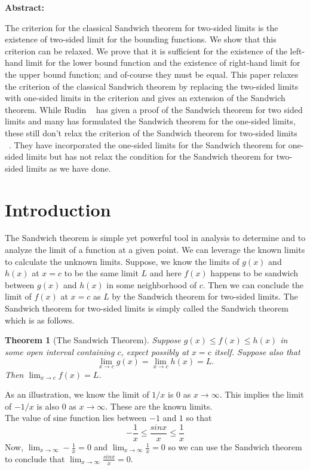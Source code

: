 \documentclass[a4paper,twoside,12pt]{article}
\theoremstyle{plain}
\newtheorem{theorem}{Theorem}[section]
\theoremstyle{definition}
\theoremstyle{theorem}
\begin{document}
\vspace{5mm}
\noindent
\textbf{Abstract:} {The criterion for the classical Sandwich theorem for two-sided limits is the existence of two-sided limit for the bounding functions. We show that this criterion can be relaxed. We prove that it is sufficient for the existence of the left-hand limit for the lower bound function and the existence of right-hand limit for the upper bound function; and of-course they must be equal. This paper relaxes the criterion of the classical Sandwich theorem by replacing the two-sided limits with one-sided limits in the criterion and gives an extension of the Sandwich theorem. While Rudin ~\cite{rudin} has given a proof of the Sandwich theorem for two sided limits and many has formulated the Sandwich theorem for the one-sided limits, these still don't relax the criterion of the Sandwich theorem for two-sided limits ~\cite{thomas}. They have incorporated the one-sided limits for the Sandwich theorem for one-sided limits but has not relax the condition for the Sandwich theorem for two-sided limits as we have done.
\section{Introduction}
The Sandwich theorem is simple yet powerful tool in analysis to determine and to analyze the limit of a function at a given point. We can leverage the known limits to calculate the unknown limits. Suppose, we know the limits of \(g(x)\) and \(h(x)\) at \(x=c\) to be the same limit \(L\) and here \(f(x)\) happens to be sandwich between \(g(x)\) and \(h(x)\) in some neighborhood of \(c\). Then we can conclude the limit of \(f(x)\) at \(x=c\) as \(L\) by the Sandwich theorem for two-sided limits. The Sandwich theorem for two-sided limits is simply called the Sandwich theorem which is as follows.

\begin{theorem}[The Sandwich Theorem] \cite{thomas}
  \label{two-side}
Suppose $g(x) \leq f(x) \leq h(x)$ in some open interval containing $c$, expect possibly at $x=c$ itself. Suppose also that $$\lim_{x \to c} g(x) = \lim_{x \to c} h(x) =L  .$$ Then $\displaystyle \lim_{x \to c} f(x)=L$.
\end{theorem}


As an illustration, we know the limit of \(1/x\) is \(0\) as \(x
\to \infty\). This implies the limit of \(-1/x\) is also \(0\) as \(x \to \infty\). These are the known limits.\\
The value of sine function lies between \(-1\) and \(1\) so that \[\displaystyle -\frac{1}{x} \leq \frac{sinx}{x} \leq \frac{1}{x}\]
Now, \(\displaystyle \lim_{x \to \infty} -\frac{1}{x}=0\) and \(\displaystyle \lim_{x \to \infty} \frac{1}{x}=0\) so we can use the Sandwich theorem to conclude that \(\displaystyle \lim_{x \to \infty} \frac{sinx}{x}=0\).
\vspace{5mm}
}
\end{document}
